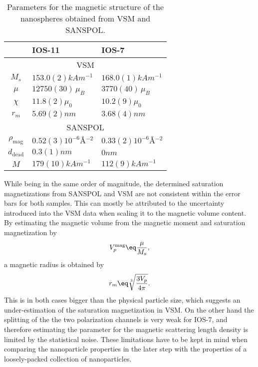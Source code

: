 \documentclass[\main/dresen_thesis.tex]{subfiles}
\begin{document}
\begin{table}[tb]
  \centering
  \caption{\label{tab:looselyPackedNP:nanoparticle:vsmSanspol}Parameters for the magnetic structure of the nanospheres obtained from VSM and SANSPOL.}
  \begin{tabular}{ c | l | l }
      & IOS-11 & IOS-7 \\
    \hline
    \multicolumn{3}{c}{VSM}\\
    \hline
    $M_s$
      & $153.0(2) \unit{kAm^{-1}}$
      & $168.0(1) \unit{kAm^{-1}}$\\
    $\mu$
      & $12750(30) \, \mu_B$
      & $3770(40) \, \mu_B$\\
    $\chi$
      & $11.8(2) \mu_0$
      & $10.2(9) \mu_0$\\
    \hline
    $r_m$
      & $5.69(2) \unit{nm}$
      & $3.68(4) \unit{nm}$\\
    \hline
    \multicolumn{3}{c}{SANSPOL}\\
    \hline
    $\rho_\mathrm{mag}$
      & $0.52(3) \unit{10^{-6} \angstrom^{-2}}$
      & $0.33(2) \unit{10^{-6} \angstrom^{-2}}$\\
    $d_\mathrm{dead}$
      & $0.3(1) \unit{nm}$
      & $0 \unit{nm}$\\
    \hline
    $M$
      & $179(10) \unit{kAm^{-1}}$
      & $112(9) \unit{kAm^{-1}}$\\
    \hline
  \end{tabular}
\end{table}

While being in the same order of magnitude, the determined saturation magnetizations from SANSPOL and VSM are not consistent within the error bars for both samples.
This can mostly be attributed to the uncertainty introduced into the VSM data when scaling it to the magnetic volume content.
By estimating the magnetic volume from the magnetic moment and saturation magnetization by
\begin{align}
  V_p^\mathrm{mag} \eq \frac{\mu}{M_s},
\end{align}
a magnetic radius is obtained by
\begin{align}
  r_m \eq \sqrt[3]{\frac{3 V_p}{4 \pi}}.
\end{align}
This is in both cases bigger than the physical particle size, which suggests an under-estimation of the saturation magnetization in VSM.
On the other hand the splitting of the the two polarization channels is very weak for IOS-7, and therefore estimating the parameter for the magnetic scattering length density is limited by the statistical noise.
These limitations have to be kept in mind when comparing the nanoparticle properties in the later step with the properties of a loosely-packed collection of nanoparticles.
\end{document}
